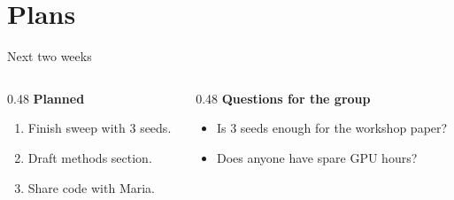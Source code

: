 \documentclass[aspectratio=169]{beamer}
\begin{document}
\section{Plans}
\begin{frame}{Next two weeks}
  \begin{columns}[T]
    \begin{column}{0.48\textwidth}
      \textbf{Planned}
      \begin{enumerate}
        \item Finish sweep with 3 seeds.
        \item Draft methods section.
        \item Share code with Maria.
      \end{enumerate}
    \end{column}
    \begin{column}{0.48\textwidth}
      \textbf{Questions for the group}
      \begin{itemize}
        \item Is 3 seeds enough for the workshop paper?
        \item Does anyone have spare GPU hours?
      \end{itemize}
    \end{column}
  \end{columns}
\end{frame}
\end{document}
